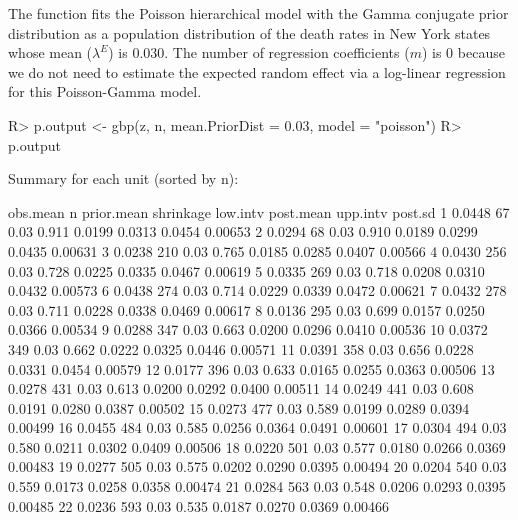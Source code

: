 \documentclass[article]{jss}
\begin{document}
The function  fits the Poisson hierarchical model with the Gamma conjugate prior distribution as a population distribution of the death rates in New York states whose mean ($\lambda^E$) is 0.030. The number of regression coefficients ($m$) is 0 because we do not need to estimate the expected random effect via a log-linear regression for this Poisson-Gamma model. 
\begin{CodeChunk}
\begin{CodeInput}
R> p.output <- gbp(z, n, mean.PriorDist = 0.03, model = "poisson")
R> p.output
\end{CodeInput}
\begin{CodeOutput}
Summary for each unit (sorted by n):

         obs.mean    n prior.mean shrinkage low.intv post.mean upp.intv post.sd
1          0.0448   67       0.03     0.911   0.0199    0.0313   0.0454 0.00653
2          0.0294   68       0.03     0.910   0.0189    0.0299   0.0435 0.00631
3          0.0238  210       0.03     0.765   0.0185    0.0285   0.0407 0.00566
4          0.0430  256       0.03     0.728   0.0225    0.0335   0.0467 0.00619
5          0.0335  269       0.03     0.718   0.0208    0.0310   0.0432 0.00573
6          0.0438  274       0.03     0.714   0.0229    0.0339   0.0472 0.00621
7          0.0432  278       0.03     0.711   0.0228    0.0338   0.0469 0.00617
8          0.0136  295       0.03     0.699   0.0157    0.0250   0.0366 0.00534
9          0.0288  347       0.03     0.663   0.0200    0.0296   0.0410 0.00536
10         0.0372  349       0.03     0.662   0.0222    0.0325   0.0446 0.00571
11         0.0391  358       0.03     0.656   0.0228    0.0331   0.0454 0.00579
12         0.0177  396       0.03     0.633   0.0165    0.0255   0.0363 0.00506
13         0.0278  431       0.03     0.613   0.0200    0.0292   0.0400 0.00511
14         0.0249  441       0.03     0.608   0.0191    0.0280   0.0387 0.00502
15         0.0273  477       0.03     0.589   0.0199    0.0289   0.0394 0.00499
16         0.0455  484       0.03     0.585   0.0256    0.0364   0.0491 0.00601
17         0.0304  494       0.03     0.580   0.0211    0.0302   0.0409 0.00506
18         0.0220  501       0.03     0.577   0.0180    0.0266   0.0369 0.00483
19         0.0277  505       0.03     0.575   0.0202    0.0290   0.0395 0.00494
20         0.0204  540       0.03     0.559   0.0173    0.0258   0.0358 0.00474
21         0.0284  563       0.03     0.548   0.0206    0.0293   0.0395 0.00485
22         0.0236  593       0.03     0.535   0.0187    0.0270   0.0369 0.00466

\end{CodeOutput}
\end{CodeChunk}
\end{document}
